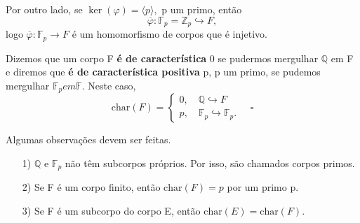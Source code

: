 \documentclass[algebraII_notes.tex]{subfiles}
\begin{document}
Por outro lado, se \(\ker{(\varphi )} = \langle p \rangle,\) p um primo, então
\[
	\overline{\varphi }:\mathbb{F}_{p}=\mathbb{Z}_{p}\hookrightarrow F,
\]
logo \(\overline{\varphi }:\mathbb{F}_{p}\rightarrow F\) é um homomorfismo de corpos que é injetivo.
\begin{def*}
	Dizemos que um corpo F \textbf{é de característica} 0 se pudermos mergulhar \(\mathbb{Q}\) em F e diremos que \textbf{é de característica positiva} p, p
	um primo, se pudemos mergulhar \(\mathbb{F}_{p} em \mathbb{F}.\) Neste caso,
	\[
		\mathrm{char}{(F)} = \left\{\begin{array}{ll}
			0,\quad \mathbb{Q}\hookrightarrow F \\
			p,\quad \mathbb{F}_{p}\hookrightarrow \mathbb{F}_{p}.
		\end{array}\right.\quad\square
	\]
\end{def*}
Algumas observações devem ser feitas.
\begin{itemize}
	\item[1)] \(\mathbb{Q}\) e \(\mathbb{F}_{p}\) não têm subcorpos próprios. Por isso, são chamados corpos primos.
	\item[2)] Se F é um corpo finito, então \(\mathrm{char}(F) = p\) por um primo p.
	\item[3)] Se F é um subcorpo do corpo E, então \(\mathrm{char}(E) = \mathrm{char}(F).\)
\end{itemize}
\end{document}
